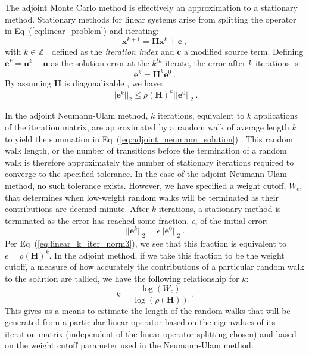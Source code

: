 \documentclass[preprint,11pt]{elsarticle}
\newcommand{\ve}[1]{\ensuremath{\mathbf{#1}}}
\begin{document}
The adjoint Monte Carlo method is effectively an approximation to a
stationary method. Stationary methods for linear systems arise from
splitting the operator in Eq~(\ref{eq:linear_problem}) and iterating:
\begin{equation}
  \ve{x}^{k+1} = \ve{H}\ve{x}^k + \ve{c}\:,
  \label{eq:linear_iterative_method}
\end{equation}
with $k \in \mathbb{Z}^+$ defined as the \textit{iteration index} and $\ve{c}$
a modified source term. Defining $\ve{e}^k = \ve{u}^k - \ve{u}$ as the
solution error at the $k^{th}$ iterate, the error after $k$ iterations is:
\begin{equation}
  \ve{e}^{k} = \ve{H}^k\ve{e}^0\:. 
  \label{eq:linear_k_iter_error}
\end{equation}
By assuming $\ve{H}$ is diagonalizable \cite{leveque_finite_2007}, we have:
\begin{equation}
  ||\ve{e}^{k}||_2 \leq \rho(\ve{H})^k ||\ve{e}^0||_2\:.
  \label{eq:linear_k_iter_norm3}
\end{equation}

In the adjoint Neumann-Ulam method, $k$ iterations, equivalent to $k$
applications of the iteration matrix, are approximated by a random walk of
average length $k$ to yield the summation in
Eq~(\ref{eq:adjoint_neumann_solution})
\cite{dimov_new_1998,danilov_asymptotic_2000}. This random walk length, or the
number of transitions before the termination of a random walk is therefore
approximately the number of stationary iterations required to converge to the
specified tolerance. In the case of the adjoint Neumann-Ulam method, no such
tolerance exists. However, we have specified a weight cutoff, $W_c$, that
determines when low-weight random walks will be terminated as their
contributions are deemed minute. After $k$ iterations, a stationary method is
terminated as the error has reached some fraction, $\epsilon$, of the initial
error:
\begin{equation}
  ||\ve{e}^{k}||_2 = \epsilon ||\ve{e}^0||_2\:.
  \label{eq:linear_k_iter_norm4}
\end{equation}
Per Eq~(\ref{eq:linear_k_iter_norm3}), we see that this fraction is equivalent
to $\epsilon = \rho(\ve{H})^k$. In the adjoint method, if we take this
fraction to be the weight cutoff, a measure of how accurately the
contributions of a particular random walk to the solution are tallied, we have
the following relationship for $k$:
\begin{equation}
  k = \frac{ \log(W_c) }{ \log( \rho(\ve{H}) ) }\:.
  \label{eq:analytic_k}
\end{equation}
This gives us a means to estimate the length of the random walks that will be
generated from a particular linear operator based on the eigenvalues of its
iteration matrix (independent of the linear operator splitting chosen) and
based on the weight cutoff parameter used in the Neumann-Ulam method.
\end{document}
